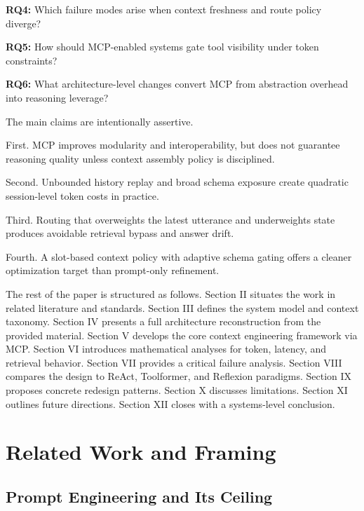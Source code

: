 \documentclass[conference]{IEEEtran}
\begin{document}
\textbf{RQ4:}
Which failure modes arise when context freshness and route policy diverge?

\textbf{RQ5:}
How should MCP-enabled systems gate tool visibility under token constraints?

\textbf{RQ6:}
What architecture-level changes convert MCP from abstraction overhead into reasoning leverage?

The main claims are intentionally assertive.

First.
MCP improves modularity and interoperability, but does not guarantee reasoning quality unless context assembly policy is disciplined.

Second.
Unbounded history replay and broad schema exposure create quadratic session-level token costs in practice.

Third.
Routing that overweights the latest utterance and underweights state produces avoidable retrieval bypass and answer drift.

Fourth.
A slot-based context policy with adaptive schema gating offers a cleaner optimization target than prompt-only refinement.

The rest of the paper is structured as follows.
Section II situates the work in related literature and standards.
Section III defines the system model and context taxonomy.
Section IV presents a full architecture reconstruction from the provided material.
Section V develops the core context engineering framework via MCP.
Section VI introduces mathematical analyses for token, latency, and retrieval behavior.
Section VII provides a critical failure analysis.
Section VIII compares the design to ReAct, Toolformer, and Reflexion paradigms.
Section IX proposes concrete redesign patterns.
Section X discusses limitations.
Section XI outlines future directions.
Section XII closes with a systems-level conclusion.

\section{Related Work and Framing}
\label{sec:related}

\subsection{Prompt Engineering and Its Ceiling}
\end{document}
